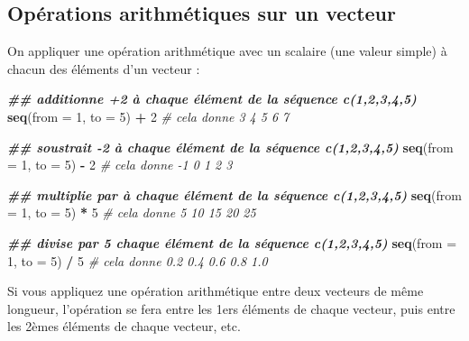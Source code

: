 \documentclass[
]{book}
\newenvironment{Shaded}{\begin{snugshade}}{\end{snugshade}}
\newcommand{\AttributeTok}[1]{\textcolor[rgb]{0.13,0.29,0.53}{#1}}
\newcommand{\CommentTok}[1]{\textcolor[rgb]{0.56,0.35,0.01}{\textit{#1}}}
\newcommand{\DecValTok}[1]{\textcolor[rgb]{0.00,0.00,0.81}{#1}}
\newcommand{\DocumentationTok}[1]{\textcolor[rgb]{0.56,0.35,0.01}{\textbf{\textit{#1}}}}
\newcommand{\FunctionTok}[1]{\textcolor[rgb]{0.13,0.29,0.53}{\textbf{#1}}}
\newcommand{\NormalTok}[1]{#1}
\newcommand{\SpecialCharTok}[1]{\textcolor[rgb]{0.81,0.36,0.00}{\textbf{#1}}}
\begin{document}
\subsection{Opérations arithmétiques sur un vecteur}\label{opuxe9rations-arithmuxe9tiques-sur-un-vecteur}

On appliquer une opération arithmétique avec un scalaire (une valeur simple) à chacun des éléments d'un vecteur :

\begin{Shaded}
\begin{Highlighting}[]
\DocumentationTok{\#\# additionne +2 à chaque élément de la séquence c(1,2,3,4,5)}
\FunctionTok{seq}\NormalTok{(}\AttributeTok{from =} \DecValTok{1}\NormalTok{, }\AttributeTok{to =} \DecValTok{5}\NormalTok{) }\SpecialCharTok{+} \DecValTok{2} \CommentTok{\# cela donne 3 4 5 6 7}

\DocumentationTok{\#\# soustrait {-}2 à chaque élément de la séquence c(1,2,3,4,5)}
\FunctionTok{seq}\NormalTok{(}\AttributeTok{from =} \DecValTok{1}\NormalTok{, }\AttributeTok{to =} \DecValTok{5}\NormalTok{) }\SpecialCharTok{{-}} \DecValTok{2} \CommentTok{\# cela donne {-}1  0  1  2  3}

\DocumentationTok{\#\# multiplie par à chaque élément de la séquence c(1,2,3,4,5)}
\FunctionTok{seq}\NormalTok{(}\AttributeTok{from =} \DecValTok{1}\NormalTok{, }\AttributeTok{to =} \DecValTok{5}\NormalTok{) }\SpecialCharTok{*} \DecValTok{5} \CommentTok{\# cela donne 5 10 15 20 25}

\DocumentationTok{\#\# divise par 5 chaque élément de la séquence c(1,2,3,4,5)}
\FunctionTok{seq}\NormalTok{(}\AttributeTok{from =} \DecValTok{1}\NormalTok{, }\AttributeTok{to =} \DecValTok{5}\NormalTok{) }\SpecialCharTok{/} \DecValTok{5} \CommentTok{\# cela donne 0.2 0.4 0.6 0.8 1.0}
\end{Highlighting}
\end{Shaded}

Si vous appliquez une opération arithmétique entre deux vecteurs de même longueur, l'opération se fera entre les 1ers éléments de chaque vecteur, puis entre les 2èmes éléments de chaque vecteur, etc.
\end{document}
